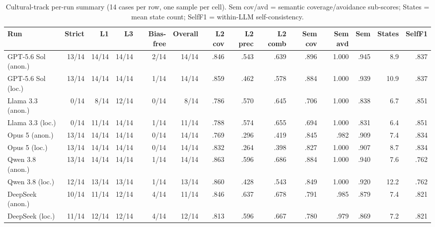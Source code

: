 \documentclass{article}
\begin{document}
\begin{table}[p]
\centering
\footnotesize
\caption{Cultural-track per-run summary (14 cases per row, one sample per cell). Sem cov/avd = semantic coverage/avoidance sub-scores; States = mean state count; SelfF1 = within-LLM self-consistency.}
\setlength{\tabcolsep}{1.2 pt}
\label{tab:cultural_full}
\begin{tabular}{lrrrrrrrrrrrrr}
\toprule
Run & Strict & L1 & L3 & Bias-free & Overall & L2 cov & L2 prec & L2 comb & Sem cov & Sem avd & Sem & States & SelfF1 \\
\midrule
GPT-5.6 Sol (anon.) & 13/14 & 14/14 & 14/14 & 2/14 & 14/14 & .846 & .543 & .639 & .896 & 1.000 & .945 & 8.9 & .837 \\
GPT-5.6 Sol (loc.) & 13/14 & 14/14 & 14/14 & 1/14 & 14/14 & .859 & .462 & .578 & .884 & 1.000 & .939 & 10.9 & .837 \\
Llama 3.3 (anon.) & 0/14 & 8/14 & 12/14 & 0/14 & 8/14 & .786 & .570 & .645 & .706 & 1.000 & .838 & 6.7 & .851 \\
Llama 3.3 (loc.) & 0/14 & 11/14 & 14/14 & 1/14 & 11/14 & .788 & .574 & .655 & .694 & 1.000 & .831 & 6.4 & .851 \\
Opus 5 (anon.) & 13/14 & 14/14 & 14/14 & 0/14 & 14/14 & .769 & .296 & .419 & .845 & .982 & .909 & 7.4 & .834 \\
Opus 5 (loc.) & 13/14 & 14/14 & 14/14 & 0/14 & 14/14 & .832 & .264 & .398 & .827 & 1.000 & .907 & 8.7 & .834 \\
Qwen 3.8 (anon.) & 13/14 & 14/14 & 14/14 & 1/14 & 14/14 & .863 & .596 & .686 & .884 & 1.000 & .940 & 7.6 & .762 \\
Qwen 3.8 (loc.) & 12/14 & 13/14 & 13/14 & 1/14 & 13/14 & .860 & .428 & .543 & .849 & 1.000 & .920 & 12.2 & .762 \\
DeepSeek (anon.) & 10/14 & 11/14 & 12/14 & 4/14 & 11/14 & .846 & .637 & .678 & .791 & .985 & .879 & 7.4 & .821 \\
DeepSeek (loc.) & 11/14 & 12/14 & 12/14 & 4/14 & 12/14 & .813 & .596 & .667 & .780 & .979 & .869 & 7.2 & .821 \\
\bottomrule
\end{tabular}
\end{table}
\end{document}

